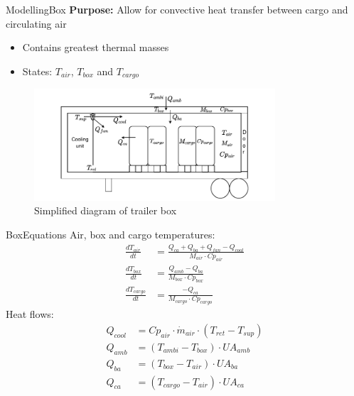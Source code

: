 
\begin{frame}{Modelling}{Box}
	\textbf{Purpose:} Allow for convective heat transfer between cargo and circulating air
	\begin{itemize}
		\item Contains greatest thermal masses
		\item States: $T_{air}$, $T_{box}$ and $T_{cargo}$
	\end{itemize}
	\begin{figure}[h!]
		\centering
		\includegraphics[width=0.8\textwidth]{../Graphics/Box.pdf}
		\caption{Simplified diagram of trailer box}
		\label{fig:box_diagram}
	\end{figure}


\end{frame}

\begin{frame}{Box}{Equations}
	Air, box and cargo temperatures:
	\begin{align}
		\frac{dT_{air}}{dt} &= \frac{Q_{ca} + Q_{ba} + Q_{fan} -Q_{cool}}{M_{air} \cdot Cp_{air}} \label{eq:box_dT_air} \\
		\frac{dT_{box}}{dt} &= \frac{Q_{amb} - Q_{ba}}{M_{box} \cdot Cp_{box}} \label{eq:box_dT_box} \\
		\frac{dT_{cargo}}{dt} &= \frac{-Q_{ca}}{M_{cargo} \cdot Cp_{cargo}} \label{eq:box_dT_cargo}
	\end{align}
	Heat flows:
	\begin{align}
		Q_{cool}   & = Cp_{air} \cdot \dot{m}_{air} \cdot (T_{ret} - T_{sup})	\label{eq:box_Qcool} \\
		Q_{amb}    & = (T_{ambi} - T_{box}) \cdot U A_{amb}						\label{eq:box_Qab}   \\
		Q_{ba}     & = (T_{box} - T_{air}) \cdot U A_{ba}						\label{eq:box_Qba}   \\
		Q_{ca}     & = (T_{cargo} - T_{air}) \cdot U A_{ca}                  	\label{eq:box_Qca}
	\end{align}
\end{frame}

